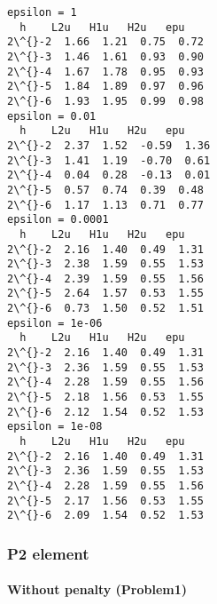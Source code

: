 \documentclass[11pt]{article}
\begin{document}
    \begin{Verbatim}[commandchars=\\\{\}]
epsilon = 1
  h    L2u   H1u   H2u   epu
2\^{}-2  1.66  1.21  0.75  0.72
2\^{}-3  1.46  1.61  0.93  0.90
2\^{}-4  1.67  1.78  0.95  0.93
2\^{}-5  1.84  1.89  0.97  0.96
2\^{}-6  1.93  1.95  0.99  0.98
epsilon = 0.01
  h    L2u   H1u   H2u   epu
2\^{}-2  2.37  1.52  -0.59  1.36
2\^{}-3  1.41  1.19  -0.70  0.61
2\^{}-4  0.04  0.28  -0.13  0.01
2\^{}-5  0.57  0.74  0.39  0.48
2\^{}-6  1.17  1.13  0.71  0.77
epsilon = 0.0001
  h    L2u   H1u   H2u   epu
2\^{}-2  2.16  1.40  0.49  1.31
2\^{}-3  2.38  1.59  0.55  1.53
2\^{}-4  2.39  1.59  0.55  1.56
2\^{}-5  2.64  1.57  0.53  1.55
2\^{}-6  0.73  1.50  0.52  1.51
epsilon = 1e-06
  h    L2u   H1u   H2u   epu
2\^{}-2  2.16  1.40  0.49  1.31
2\^{}-3  2.36  1.59  0.55  1.53
2\^{}-4  2.28  1.59  0.55  1.56
2\^{}-5  2.18  1.56  0.53  1.55
2\^{}-6  2.12  1.54  0.52  1.53
epsilon = 1e-08
  h    L2u   H1u   H2u   epu
2\^{}-2  2.16  1.40  0.49  1.31
2\^{}-3  2.36  1.59  0.55  1.53
2\^{}-4  2.28  1.59  0.55  1.56
2\^{}-5  2.17  1.56  0.53  1.55
2\^{}-6  2.09  1.54  0.52  1.53
    \end{Verbatim}

    \subsubsection{P2 element}\label{p2-element}

    \paragraph{Without penalty (Problem1)}\label{without-penalty-problem1}
\end{document}

